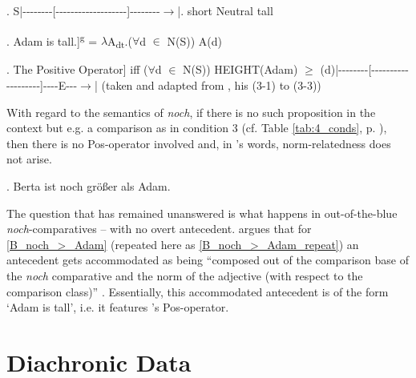 \documentclass[output=paper,
modfonts
]{langscibook}
\begin{document}
\ex. S\hspace{15}|{-}{-}{-}{-}{-}{-}{-}{-}{[}{-}{-}{-}{-}{-}{-}{-}{-}{-}{-}{-}{-}{-}{-}{-}{-}{-}{-}{-}{]}{-}{-}{-}{-}{-}{-}{-}{-}$\to$|\newline \tiny.\normalsize\hspace{22} short \hspace{20} Neutral \hspace{25} tall

\ex. Adam is tall.\newline [[\textbf{Pos}\textsubscript{N,S}]]\textsuperscript{g} = $\lambda$A\textsubscript{dt}.(\textbf{$\forall$}d $\in$ N(S)) A(d) 

\ex. The Positive Operator\newline [[\textbf{Pos}\textsubscript{N,S}$\lambda$d.tall\textsubscript{S}(d)(Adam)]] iff ($\forall$d $\in$ N(S)) HEIGHT(Adam) $\geq$ (d)\newline|{-}{-}{-}{-}{-}{-}{-}{-}{[}{-}{-}{-}{-}{-}{-}{-}{-}{-}{-}{-}{-}{-}{-}{-}{-}{-}{-}{-}{]}{-}{-}{-}{-}{E}{-}{-}{-}$\to$| \flushright (taken and adapted from \citeauthor{stechow2006} \citeyearpar{stechow2006}, his (3-1) to (3-3))

With regard to the semantics of \textit{noch}, if there is no such proposition in the context but e.g. a comparison as in condition 3 (cf. Table \ref{tab:4_conds}, p. \pageref{tab:4_conds}), then there is no Pos-operator involved \citep[62]{stechow1984} and, in \citeauthor{umbach2009a_comp}'s words, norm-relatedness does not arise. 

\ex. Berta ist noch größer als Adam. \label{B_noch_>_Adam_repeat}

The question that has remained unanswered is what happens in out-of-the-blue \textit{noch}-comparatives -- with no overt antecedent. \citeauthor{umbach2009a_comp} argues that for \ref{B_noch_>_Adam} (repeated here as \ref{B_noch_>_Adam_repeat}) an antecedent gets accommodated as being ``composed out of the comparison base of the \textit{noch} comparative and the norm of the adjective (with respect to the comparison class)'' \citep[10]{umbach2009a_comp}. Essentially, this accommodated antecedent is of the form `Adam is tall', i.e. it features \citeauthor{stechow2006}'s \citeyearpar{stechow2006} Pos-operator. 


\section{Diachronic Data}\label{sec_diachronic_data}
\end{document}

